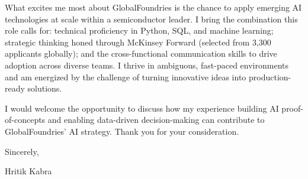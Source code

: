 \documentclass[letterpaper,10pt]{article}
\begin{document}
What excites me most about GlobalFoundries is the chance to apply emerging AI technologies at scale within a semiconductor leader. I bring the combination this role calls for: technical proficiency in Python, SQL, and machine learning; strategic thinking honed through McKinsey Forward (selected from 3,300 applicants globally); and the cross-functional communication skills to drive adoption across diverse teams. I thrive in ambiguous, fast-paced environments and am energized by the challenge of turning innovative ideas into production-ready solutions.

I would welcome the opportunity to discuss how my experience building AI proof-of-concepts and enabling data-driven decision-making can contribute to GlobalFoundries' AI strategy. Thank you for your consideration.

Sincerely,

Hritik Kabra
\end{document}
